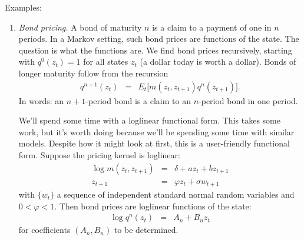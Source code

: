 \documentclass[11pt]{article}
\begin{document}
Examples:
%
\begin{enumerate}

\begin{comment}
\item {\it Discounting cash flows.\/}
We can represent equity valuation as either an infinite discounted present value or a sequence.
In the former, we might treat equity at date $t$
as a claim to the dividend stream $d_{t+1}, d_{t+2}, \ldots $
and discount them with the discount factor $\delta$:
\begin{eqnarray*}
    v_t &=& \sum_{j=1}^\infty \delta^j d_{t+j} ,
\end{eqnarray*}
In a finance course we would typically replace $\delta$ with $1/(1+i)$, but this is more compact.

Here's a recursive version where we add one dividend at a time.
Consider the sequence
\begin{eqnarray}
    v_t^{n+1} &=& \delta (d_{t+1} + v^n_{t+1} ) ,
    \label{eq:equity-deterministic}
\end{eqnarray}
starting with $v^0_t = 0$.
That gives us the sequence
\begin{eqnarray*}
    v^1_t &=& \delta (d_{t+1} + v^0_{t+1}) \;\;=\;\; \delta d_{t+1}  \\
    v^2_t &=& \delta (d_{t+1} + v^1_{t+1}) \;\;=\;\; \delta d_{t+1} + \delta^2 d_{t+2} ,
\end{eqnarray*}
and so on.
The limit of this sequence is the infinite sum.
\end{comment}


\item {\it Bond pricing.\/}
A bond of maturity $n$ is a claim to a payment of one in $n$ periods.
In a Markov setting, such bond prices are functions of the state.
The question is what the functions are.
%
We find bond prices recursively, starting with $q^0(z_t) = 1$ for
all states $z_t$ (a dollar today is worth a dollar).
Bonds of longer maturity follow from the recursion
\begin{eqnarray}
    q^{n+1}(z_t) &=& E_t \big[ m(z_t,z_{t+1}) q^n(z_{t+1})\big] .
    \label{eq:recursion-bond}
\end{eqnarray}
In words:  an $n+1$-period bond is a claim to an $n$-period bond in one period.

We'll spend some time with a loglinear functional form.
This takes some work, but it's worth doing because we'll be spending
some time with similar models.
Despite how it might look at first, this is a user-friendly functional form.
Suppose the pricing kernel is loglinear:
\begin{eqnarray*}
    \log m(z_t, z_{t+1} ) &=& \delta + a z_t + b z_{t+1} \\
            z_{t+1} &=& \varphi z_t + \sigma w_{t+1}
\end{eqnarray*}
with $\{ w_t \} $ a sequence of independent standard normal
random variables and $0 < \varphi < 1$.
Then bond prices are loglinear functions of the state:
\begin{eqnarray}
    \log q^n(z_t) &=& A_n + B_n z_t
    \label{eq:bond-loglin}
\end{eqnarray}
for coefficients $(A_n, B_n)$ to be determined.


\end{enumerate}
\end{document}
